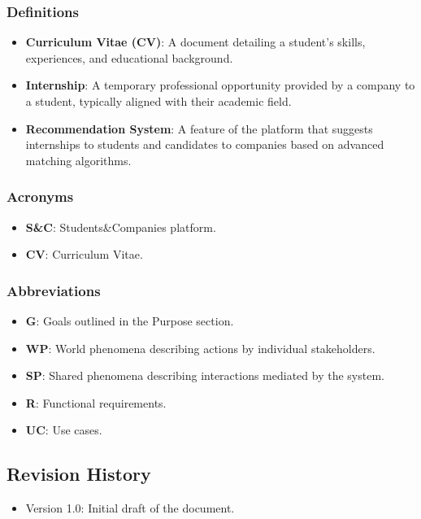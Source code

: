 \documentclass[12pt]{article}
\numberwithin{figure}{section}
\numberwithin{table}{section}
\begin{document}
\subsubsection{Definitions}
\begin{itemize}
    \item \textbf{Curriculum Vitae (CV)}: A document detailing a student's skills, experiences, and educational background.
    \item \textbf{Internship}: A temporary professional opportunity provided by a company to a student, typically aligned with their academic field.
    \item \textbf{Recommendation System}: A feature of the platform that suggests internships to students and candidates to companies based on advanced matching algorithms.
\end{itemize}

\subsubsection{Acronyms}
\begin{itemize}
    \item \textbf{S\&C}: Students\&Companies platform.
    \item \textbf{CV}: Curriculum Vitae.
\end{itemize}

\subsubsection{Abbreviations}
\begin{itemize}
    \item \textbf{G}: Goals outlined in the Purpose section.
    \item \textbf{WP}: World phenomena describing actions by individual stakeholders.
    \item \textbf{SP}: Shared phenomena describing interactions mediated by the system.
    \item \textbf{R}: Functional requirements.
    \item \textbf{UC}: Use cases.
\end{itemize}

\subsection{Revision History}
\begin{itemize}
    \item Version 1.0: Initial draft of the document.
\end{itemize}
\end{document}
